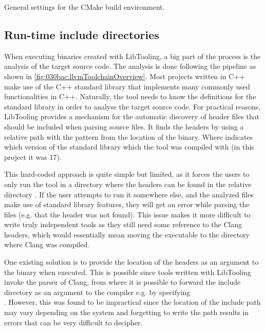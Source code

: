 \begin{listing}[H]
    \caption{General settings for the CMake build environment.}
    \label{code:080dev:cmake_base_settings}
\end{listing}

\subsection{Run-time include directories}\label{subsec:080dev:rt_include}
When executing binaries created with LibTooling, a big part of the process is the analysis of the target source code. The analysis is done following the pipeline as shown in \cref{fig:030bac:llvmToolchainOverview}. Most projects written in C++ make use of the C++ standard library that implements many commonly used functionalities in C++. Naturally, the tool needs to know the definitions for the standard library in order to analyse the target source code. 
For practical reasons, LibTooling provides a mechanism for the automatic discovery of header files that should be included when parsing source files. It finds the headers by using a relative path with the pattern  from the location of the binary. Where  indicates which version of the standard library which the tool was compiled with (in this project it was 17).

This hard-coded approach is quite simple but limited, as it forces the users to only run the tool in a directory where the headers can be found in the relative directory .
If the user attempts to run it somewhere else, and the analyzed files make use of standard library features, they will get an error while parsing the files (e.g. that the header  was not found).
This issue makes it more difficult to write truly independent tools as they still need some reference to the Clang headers, which would essentially mean moving the executable to the directory where Clang was compiled.

One existing solution is to provide the location of the headers as an argument to the binary when executed. This is possible since tools written with LibTooling invoke the parser of Clang, from where it is possible to forward the include directory as an argument to the compiler e.g. by specifying\\.
However, this was found to be impractical since the location of the include path may vary depending on the system and forgetting to write the path results in errors that can be very difficult to decipher.

